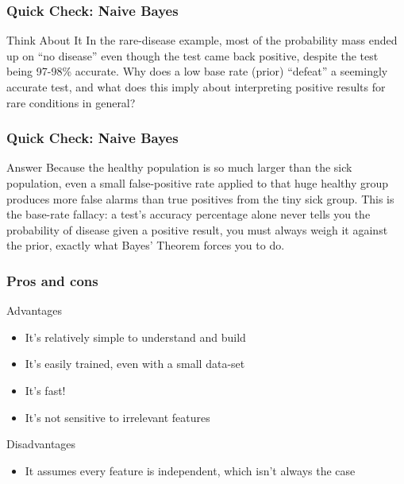 \begin{frame}[fragile]\frametitle{Quick Check: Naive Bayes}
\begin{block}{Think About It}
In the rare-disease example, most of the probability mass ended up on ``no disease'' even
though the test came back positive, despite the test being 97-98\% accurate. Why does a low
base rate (prior) ``defeat'' a seemingly accurate test, and what does this imply about
interpreting positive results for rare conditions in general?
\end{block}
\end{frame}

\begin{frame}[fragile]\frametitle{Quick Check: Naive Bayes}
\begin{block}{Answer}
Because the healthy population is so much larger than the sick population, even a small
false-positive rate applied to that huge healthy group produces more false alarms than true
positives from the tiny sick group. This is the base-rate fallacy: a test's accuracy
percentage alone never tells you the probability of disease given a positive result, you
must always weigh it against the prior, exactly what Bayes' Theorem forces you to do.
\end{block}
\end{frame}

\begin{frame}[fragile]\frametitle{Pros and cons}
Advantages
\begin{itemize}
\item     It's relatively simple to understand and build
\item     It's easily trained, even with a small data-set
\item     It's fast!
\item     It's not sensitive to irrelevant features
\end{itemize}
Disadvantages
\begin{itemize}
\item     It assumes every feature is independent, which isn't always the case
\end{itemize}
\end{frame}




